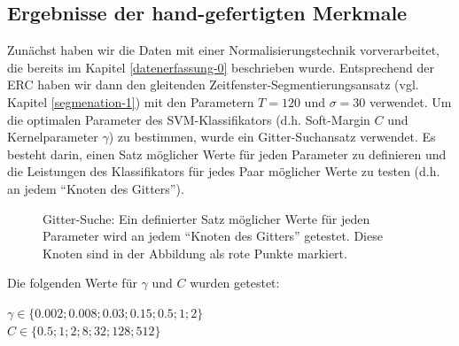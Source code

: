 \subsection{Ergebnisse der hand-gefertigten Merkmale} \label{ergebnisse-hc-features-subsec}

Zun{\"a}chst haben wir die Daten mit einer Normalisierungstechnik vorverarbeitet, die bereits im Kapitel \ref{datenerfassung-0} beschrieben wurde.
Entsprechend der ERC haben wir dann den gleitenden Zeitfenster-Segmentierungsansatz (vgl. Kapitel \ref{segmenation-1}) mit den Parametern $T=120$ und $\sigma=30$ verwendet.
Um die optimalen Parameter des SVM-Klassifikators (d.h. Soft-Margin $C$ und Kernelparameter $\gamma$) zu bestimmen, wurde ein Gitter-Suchansatz verwendet.
Es besteht darin, einen Satz m{\"o}glicher Werte f{\"u}r jeden Parameter zu definieren und die Leistungen des Klassifikators f{\"u}r jedes Paar m{\"o}glicher Werte zu testen (d.h. an jedem ``Knoten des Gitters''). \\

\begin{figure}[h]
\vspace{0.2cm} \caption[Gitter-Suche]{ Gitter-Suche: Ein definierter Satz m{\"o}glicher Werte f{\"u}r jeden Parameter wird an jedem ``Knoten des Gitters'' getestet. Diese Knoten sind in der Abbildung als rote Punkte markiert. }
\end{figure} 
\vspace{0.5cm}

Die folgenden Werte f{\"u}r $\gamma$ und $C$ wurden getestet:
\begin{center}
${\displaystyle \gamma \in \{0.002; 0.008; 0.03; 0.15; 0.5; 1; 2\}}$ \\
${\displaystyle C \in \{ 0.5; 1; 2; 8; 32; 128; 512 \}}$ \\
\end{center}
\vspace{0.5cm}

